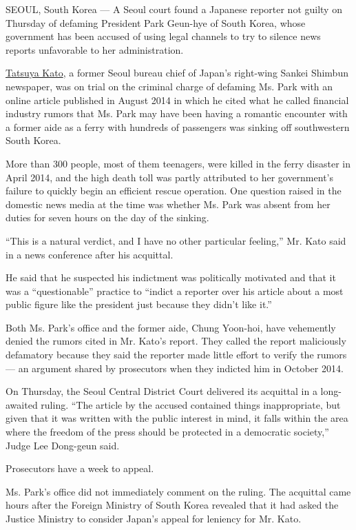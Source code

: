 SEOUL, South Korea --- A Seoul court found a Japanese reporter not
guilty on Thursday of defaming President Park Geun-hye of South Korea,
whose government has been accused of using legal channels to try to
silence news reports unfavorable to her administration.

\href{http://www.nytimes.com/2014/10/10/world/asia/japan-protests-an-indictment-of-a-journalist-.html}{Tatsuya
Kato}, a former Seoul bureau chief of Japan's right-wing Sankei Shimbun
newspaper, was on trial on the criminal charge of defaming Ms. Park with
an online article published in August 2014 in which he cited what he
called financial industry rumors that Ms. Park may have been having a
romantic encounter with a former aide as a ferry with hundreds of
passengers was sinking off southwestern South Korea.

More than 300 people, most of them teenagers, were killed in the ferry
disaster in April 2014, and the high death toll was partly attributed to
her government's failure to quickly begin an efficient rescue operation.
One question raised in the domestic news media at the time was whether
Ms. Park was absent from her duties for seven hours on the day of the
sinking.

``This is a natural verdict, and I have no other particular feeling,''
Mr. Kato said in a news conference after his acquittal.

He said that he suspected his indictment was politically motivated and
that it was a ``questionable'' practice to ``indict a reporter over his
article about a most public figure like the president just because they
didn't like it.''

Both Ms. Park's office and the former aide, Chung Yoon-hoi, have
vehemently denied the rumors cited in Mr. Kato's report. They called the
report maliciously defamatory because they said the reporter made little
effort to verify the rumors --- an argument shared by prosecutors when
they indicted him in October 2014.

On Thursday, the Seoul Central District Court delivered its acquittal in
a long-awaited ruling. ``The article by the accused contained things
inappropriate, but given that it was written with the public interest in
mind, it falls within the area where the freedom of the press should be
protected in a democratic society,'' Judge Lee Dong-geun said.

Prosecutors have a week to appeal.

Ms. Park's office did not immediately comment on the ruling. The
acquittal came hours after the Foreign Ministry of South Korea revealed
that it had asked the Justice Ministry to consider Japan's appeal for
leniency for Mr. Kato.


